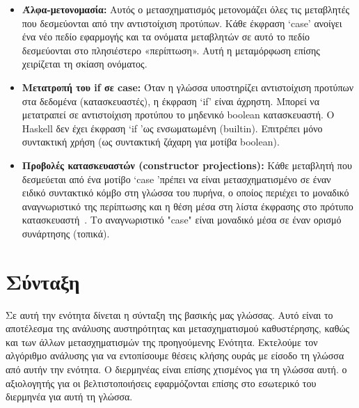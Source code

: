 \documentclass[diploma]{softlab-thesis}
\begin{document}
\begin{itemize}
\item \textbf{Άλφα-μετονομασία:} Αυτός ο μετασχηματισμός μετονομάζει όλες τις μεταβλητές που δεσμεύονται από την αντιστοίχιση προτύπων.
Κάθε έκφραση `case' ανοίγει ένα νέο πεδίο εφαρμογής και τα ονόματα μεταβλητών σε αυτό το πεδίο δεσμεύονται στο πλησιέστερο
«περίπτωση». Αυτή η μεταμόρφωση επίσης χειρίζεται τη σκίαση ονόματος.
\item \textbf{Μετατροπή του if σε case:} Όταν η γλώσσα υποστηρίζει αντιστοίχιση προτύπων στα δεδομένα
(κατασκευαστές), η έκφραση `if' είναι άχρηστη. Μπορεί να μετατραπεί σε αντιστοίχιση προτύπου
το μηδενικό boolean κατασκευαστή. Ο Haskell δεν έχει έκφραση `if 'ως ενσωματωμένη (builtin). 
Eπιτρέπει μόνο συντακτική χρήση (ως συντακτική ζάχαρη για μοτίβα boolean).
\item \textbf{Προβολές κατασκευαστών (constructor projections):} Κάθε μεταβλητή που δεσμεύεται από ένα μοτίβο 
`case 'πρέπει να είναι μετασχηματισμένο σε έναν ειδικό συντακτικό κόμβο στη γλώσσα του πυρήνα, 
ο οποίος περιέχει το μοναδικό αναγνωριστικό της περίπτωσης και η θέση μέσα στη λίστα έκφρασης 
στο πρότυπο κατασκευαστή~\cite{Fourtounis:2013:GIT:2769663.2769674}. 
Το αναγνωριστικό "case" είναι μοναδικό μέσα σε έναν ορισμό συνάρτησης (τοπικά).
\end{itemize}

\section{Σύνταξη}

Σε αυτή την ενότητα δίνεται η σύνταξη της βασικής μας γλώσσας.
Αυτό είναι το αποτέλεσμα της ανάλυσης αυστηρότητας και
μετασχηματισμού καθυστέρησης, καθώς και των άλλων μετασχηματισμών της προηγούμενης
Ενότητα. Εκτελούμε τον αλγόριθμο ανάλυσης για να εντοπίσουμε θέσεις κλήσης ουράς με είσοδο
τη γλώσσα από αυτήν την ενότητα. Ο διερμηνέας είναι επίσης χτισμένος για τη γλώσσα αυτή. 
ο αξιολογητής για
οι βελτιστοποιήσεις εφαρμόζονται επίσης στο εσωτερικό του διερμηνέα για αυτή τη γλώσσα.
\end{document}
